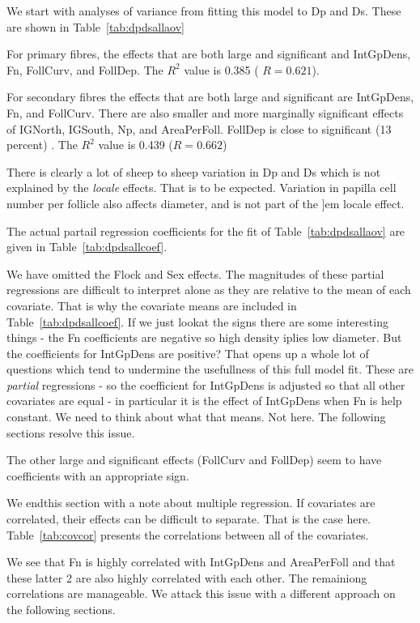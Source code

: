 \documentclass[titlepage]{article}  %
\begin{document}
We start with analyses of variance from fitting this model to Dp and Ds. These are shown in Table~\ref{tab:dpdsallaov}

For primary fibres, the effects that are both large and significant and IntGpDens, Fn, FollCurv, and FollDep. The $R^{2}$ value is 0.385 ( $R = 0.621$).

For secondary fibres the effects that are both large and significant are IntGpDens, Fn, and FollCurv. There are also smaller and more marginally significant effects of IGNorth, IGSouth, Np, and AreaPerFoll. FollDep is close to significant (13 percent)  . The $R^{2}$ value is 0.439 ($R = 0.662$)

There is clearly a lot of sheep to sheep variation in Dp and Ds which is not explained by the {\em locale} effects. That is to be expected. Variation in papilla cell number per follicle also affects diameter, and is not part of the {]em locale} effect.

The actual partail regression coefficients for the fit of Table~\ref{tab:dpdsallaov} are given in Table~\ref{tab:dpdsallcoef}.

We have omitted the Flock and Sex effects.  The magnitudes of these partial regressions are difficult to interpret alone as they are relative to the mean of each covariate. That is why the covariate means are included in Table~\ref{tab:dpdsallcoef}. If we just lookat the signs there are some interesting things - the Fn coefficients are negative so high density iplies low diameter. But the coefficients for IntGpDens are positive? That opens up a whole lot of questions which tend to undermine the usefullness of this full model fit. These are {\em partial} regressions - so the coefficient for IntGpDens is adjusted so that all other covariates are equal - in particular it is the effect of IntGpDens when Fn is help constant. We need to think about what that means.  Not here. The following sections resolve this issue. 

The other large and significant effects (FollCurv and FollDep) seem to have coefficients with an appropriate sign.

We endthis section with a note about multiple regression. If covariates are correlated, their effects can be difficult to separate. That is the case here. Table~\ref{tab:covcor} presents the correlations between all of the covariates.

We see that Fn is highly correlated with IntGpDens and AreaPerFoll and that these latter 2 are also highly correlated with each other. The remainiong correlations are manageable. We attack this issue with a different approach on the following sections.
\end{document}

